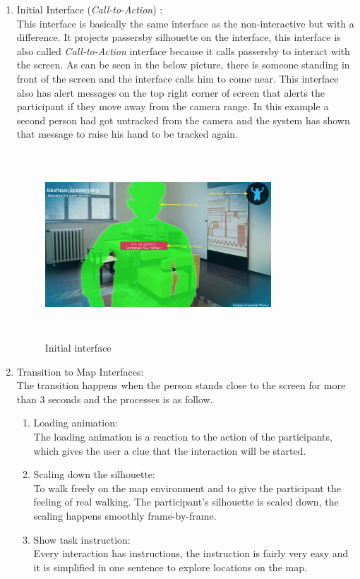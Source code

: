 \begin{enumerate}

\item Initial Interface (\emph{Call-to-Action}) : \\
This interface is basically the same interface as the non-interactive but with a difference. It projects passersby silhouette on the interface, this interface is also called \emph{Call-to-Action} interface because it calls passersby to interact with the screen. As can be seen in the below picture, there is someone standing in front of the screen and the interface calls him to come near. This interface also has alert messages on the top right corner of screen that alerts the participant if they move away from the camera range. In this example a second person had got untracked from the camera and the system has shown that message to raise his hand to be tracked again.

\begin{figure}[H]
    \centering
    \includegraphics[width=0.8\textwidth,height=70mm]{Figures/7/body_interactive/first_interface}
    \caption{Initial interface}%
    \label{fig:body_firstinterface}%
\end{figure}


\item Transition to Map Interfaces: \\
The transition happens when the person stands close to the screen for more than 3 seconds and the processes is as follow.

\begin{enumerate}
\item Loading animation:\\
 The loading animation is a reaction to the action of the participants, which gives the user a clue that the interaction will be started. 
\item Scaling down the silhouette: \\
To walk freely on the map environment and to give the participant the feeling of real walking. The participant's silhouette is scaled down, the scaling happens smoothly frame-by-frame.
\item Show task instruction:  \\
Every interaction has instructions, the instruction is fairly very easy and it is simplified in one sentence to explore locations on the map.
\end{enumerate}


\end{enumerate}
